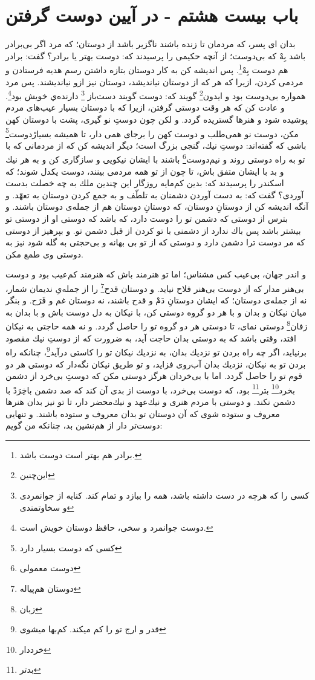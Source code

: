 \section*{باب بيست هشتم -  
در آيين دوست گرفتن}

بدان اى پسر، كه مردمان تا زنده باشند ناگزير باشد از دوستان؛ كه مرد اگر بى‌برادر باشد بِهْ كه بى‌دوست؛ از آنچه حكيمى را پرسيدند كه: دوست بهتر يا برادر؟ گفت: برادر هم دوست بِهْ\footnote{برادر هم بهتر است دوست باشد.}. پس انديشه كن به كار دوستان بتازه داشتن رسم هديه فرستادن و مردمى كردن، ازيرا كه هر كه از دوستان نیانديشد، دوستان نيز ازو نیانديشند. پس مرد همواره بى‌دوست بود و ايدون\footnote{این‌چنین} گويند كه: دوست گویند دست‌باز \footnote{کسی را که هرچه در دست داشته باشد، همه را ببازد و تمام کند. کنایه از جوانمردی و سخاوتمندی} دارنده‌ي خويش بود\footnote{دوست جوانمرد و سخی، حافظ دوستان خویش است.}. و عادت كن كه هر وقت دوستى گرفتن، ازيرا كه با دوستان بسيار عيب‌هاى مردم پوشيده شود و هنرها گستريده گردد. و لكن چون دوستِ نو گيرى، پشت با دوستان كهن مكن، دوست نو همى‌طلب و دوست كهن را برجاى همى دار، تا هميشه بسيارْدوست\footnote{کسی که دوست بسیار دارد} باشى كه گفته‌اند: دوستِ نيك، گنجى بزرگ است؛ ديگر انديشه كن كه از مردمانى كه با تو به راه دوستى روند و نيم‌دوست\footnote{دوست معمولی} باشند با ايشان نيكويى و سازگارى كن و به هر نيك و بد با ايشان متفق باش، تا چون از تو همه مردمى بينند، دوست يكدل شوند؛ كه اسكندر را پرسيدند كه: بدين كم‌مايه روزگار اين چندين ملك به چه خصلت بدست آوردى‌؟ گفت كه: به دست آوردن دشمنان به تلطّف و به جمع كردن دوستان به تعهّد. و آنگه انديشه كن از دوستانِ دوستان، كه دوستانِ دوستان هم از جمله‌ی دوستان باشند. و بترس از دوستى كه دشمن تو را دوست دارد، كه باشد كه دوستى او از دوستى تو بيشتر باشد پس باك ندارد از دشمنى با تو كردن از قبل دشمن تو. و بپرهيز از دوستى كه مر دوست ترا دشمن دارد و دوستى كه از تو بى بهانه و بى‌حجتى به گله شود نيز به دوستى وى طمع مكن.

و اندر جهان، بى‌عيب كس مشناس؛ اما تو هنرمند باش كه هنرمند كم‌عيب بود و دوست بى‌هنر مدار كه از دوست بى‌هنر فلاح نيايد. و دوستان قدح\footnote{دوستان هم‌پیاله} را از جمله‌یِ نديمان شمار، نه از جمله‌ی دوستان؛ كه ايشان دوستانِ دَمْ و قدح باشند، نه دوستان غم و فَرَح. و بنگر ميان نيكان و بدان و با هر دو گروه دوستى كن، با نيكان به دل دوست باش و با بدان به زفان\footnote{زبان} دوستى نماى، تا دوستى هر دو گروه تو را حاصل گردد. و نه همه حاجتى به نيكان افتد، وقتى باشد كه به دوستى بدان حاجت آيد، به ضرورت كه از دوستِ نيك مقصود برنيايد، اگر چه راه بردن تو نزديك بدان، به نزديك نيكان تو را كاستى درآيد\footnote{قدر و ارج تو را کم میکند. کم‌بها میشوی}، چنانكه راه بردن تو به نيكان، نزديك بدان آب‌روى فزايد، و تو طريق نيكان نگه‌دار كه دوستى هر دو قوم تو را حاصل گردد. اما با بى‌خردان هرگز دوستى مكن كه دوستِ بى‌خرد از دشمن بخرد\footnote{خرددار} بتر\footnote{بدتر} بود، كه دوست بى‌خرد، با دوست از بدى آن كند كه صد دشمن باخِرَدْ با دشمن نكند. و دوستى با مردم هنرى و نيك‌عهد و نيك‌محضر دار، تا تو نيز بدان هنرها معروف و ستوده شوى كه آن دوستان تو بدان معروف و ستوده باشند. و تنهايى دوست‌تر دار از هم‌نشين بد، چنانكه من گويم:


